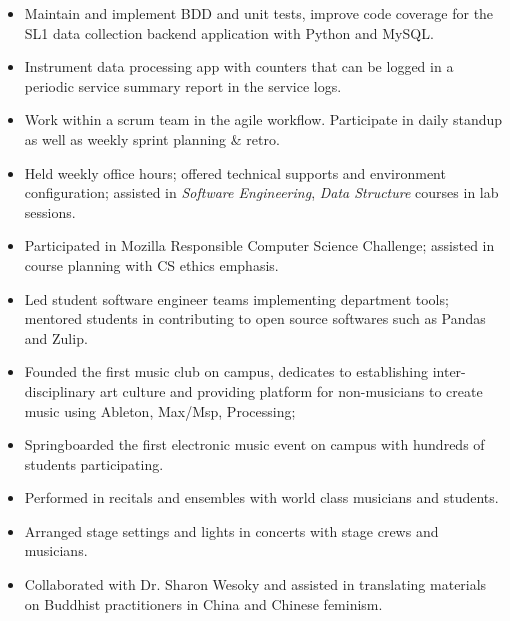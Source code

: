 \begin{itemize}
    \item Maintain and implement BDD and unit tests, improve code coverage for the SL1 data collection backend application with Python and MySQL.
    \item Instrument data processing app with counters that can be logged in a periodic service summary report in the service logs.
    \item Work within a scrum team in the agile workflow. Participate in daily standup as well as weekly sprint planning \& retro.
\end{itemize}
\smallskip
{}
\begin{itemize}
    \item Held weekly office hours; offered technical supports and environment configuration; assisted in \textit{Software Engineering}, \textit{Data Structure} courses in lab sessions.
    \item Participated in Mozilla Responsible Computer Science Challenge; assisted in course planning with CS ethics emphasis.
    \item Led student software engineer teams implementing department tools; mentored students in contributing to open source softwares such as Pandas and Zulip.
\end{itemize}
\smallskip
{}
\begin{itemize}
\item Founded the first music club on campus, dedicates to establishing inter-disciplinary art culture and providing platform for non-musicians to create music using Ableton, Max/Msp, Processing;
\item Springboarded the first electronic music event on campus with hundreds of students participating.
\end{itemize}
\smallskip
{}
\begin{itemize}
\item Performed in recitals and ensembles with world class musicians and students.
\item Arranged stage settings and lights in concerts with stage crews and musicians.
\end{itemize}
\smallskip
{}
\begin{itemize}
\item Collaborated with Dr. Sharon Wesoky and assisted in translating materials on Buddhist practitioners in China and Chinese feminism.
\end{itemize}
\smallskip

